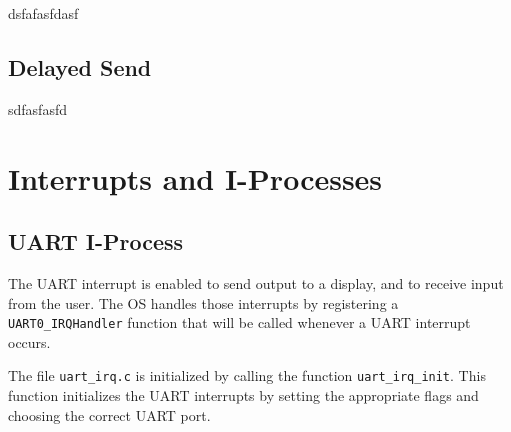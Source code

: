 \documentclass[12pt]{report}
\begin{document}
dsfafasfdasf

\subsection{Delayed Send}


sdfasfasfd


\section{Interrupts and I-Processes}

\subsection{UART I-Process}

The UART interrupt is enabled to send output to a display, and to receive input from the user. The OS handles those interrupts by registering a \texttt{UART0_IRQHandler} function that will be called whenever a UART interrupt occurs.

The file \texttt{uart_irq.c} is initialized by calling the function \texttt{uart_irq_init}. This function initializes the UART interrupts by setting the appropriate flags and choosing the correct UART port.
\end{document}

